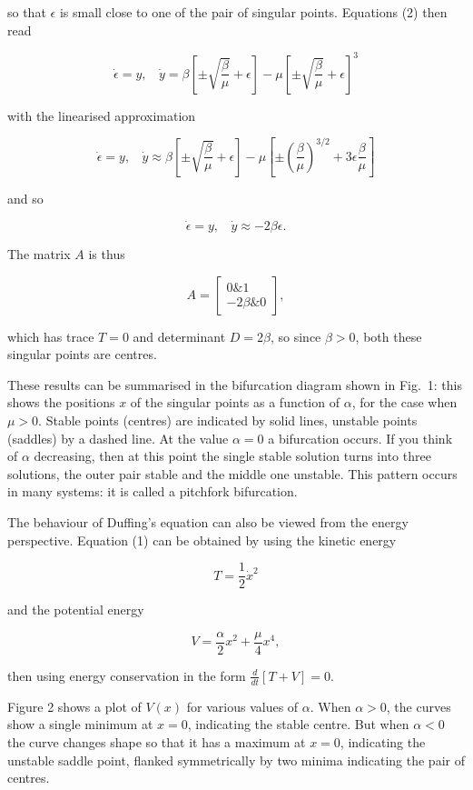   so that $\epsilon$ is small close to one of the pair of singular points. 
  Equations (2) then read 

  $$\dot{\epsilon}=y \mathrm{,~~~~} \dot{y}=\beta \left[\pm 
  \sqrt{\dfrac{\beta}{\mu}} + \epsilon \right] -\mu \left[\pm 
  \sqrt{\dfrac{\beta}{\mu}} + \epsilon\right]^3 \tag{8}$$ 

  with the linearised approximation 

  $$\dot{\epsilon}=y \mathrm{,~~~~} \dot{y} \approx \beta \left[\pm 
  \sqrt{\dfrac{\beta}{\mu}} + \epsilon \right] -\mu \left[\pm 
  \left(\dfrac{\beta}{\mu}\right)^{3/2} + 3\epsilon\dfrac{\beta}{\mu} \right] 
  \tag{9}$$ 

  and so 

  $$\dot{\epsilon}=y \mathrm{,~~~~} \dot{y} \approx -2 \beta \epsilon . 
  \tag{10}$$ 

  The matrix $A$ is thus 

  $$A=\begin{bmatrix}0 \& 1\\ -2\beta \& 0\end{bmatrix}, \tag{11}$$ 

  which has trace $T=0$ and determinant $D=2\beta$, so since $\beta > 0$, both 
  these singular points are centres. 

  These results can be summarised in the bifurcation diagram shown in Fig.\ 1: 
  this shows the positions $x$ of the singular points as a function of 
  $\alpha$, for the case when $\mu > 0$. Stable points (centres) are indicated 
  by solid lines, unstable points (saddles) by a dashed line. At the value 
  $\alpha=0$ a bifurcation occurs. If you think of $\alpha$ decreasing, then at 
  this point the single stable solution turns into three solutions, the outer 
  pair stable and the middle one unstable. This pattern occurs in many systems: 
  it is called a pitchfork bifurcation. 


  The behaviour of Duffing's equation can also be viewed from the energy 
  perspective. Equation (1) can be obtained by using the kinetic energy 

  $$T=\dfrac{1}{2} \dot{x}^2 \tag{12}$$ 

  and the potential energy 

  $$V=\dfrac{\alpha}{2} x^2 + \dfrac{\mu}{4} x^4, \tag{13}$$ 

  then using energy conservation in the form $\frac{d}{dt}[T+V]=0$. 

  Figure 2 shows a plot of $V(x)$ for various values of $\alpha$. When $\alpha 
  > 0$, the curves show a single minimum at $x=0$, indicating the stable 
  centre. But when $\alpha < 0$ the curve changes shape so that it has a 
  maximum at $x=0$, indicating the unstable saddle point, flanked symmetrically 
  by two minima indicating the pair of centres. 

